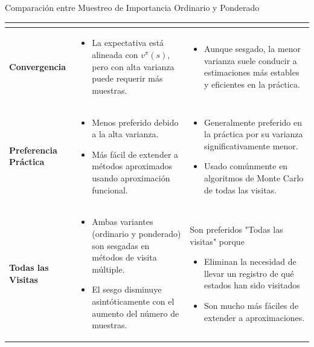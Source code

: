 \documentclass[10pt, envcountsect, handout, aspectratio=1610, hyperref={hypertexnames=true}]{beamer}
\begin{document}
\begin{frame}{Comparación entre Muestreo de Importancia Ordinario y Ponderado}
{\begin{minipage}{\textwidth}
\begin{tabular}{>{\raggedright\arraybackslash}m{3cm} >{\raggedright\arraybackslash}m{10cm} >{\raggedright\arraybackslash}m{10cm}}
\begin{itemize}
	\end{itemize}
	\\
	\midrule
	\textbf{Convergencia} & 
	\begin{itemize}
		\item La expectativa está alineada con $v^\pi(s)$, pero con alta varianza puede requerir más muestras.
	\end{itemize}
	&
	\begin{itemize}
		\item Aunque sesgado, la menor varianza suele conducir a estimaciones más estables y eficientes en la práctica.
	\end{itemize}
	\\
	\midrule
	\textbf{Preferencia Práctica} & 
	\begin{itemize}
		\item Menos preferido debido a la alta varianza.
		\item Más fácil de extender a métodos aproximados usando aproximación funcional.
	\end{itemize}
	&
	\begin{itemize}
		\item Generalmente preferido en la práctica por su varianza significativamente menor.
		\item Usado comúnmente en algoritmos de Monte Carlo de todas las visitas.
	\end{itemize}
	\\
	\midrule \midrule \midrule
	\textbf{Todas las Visitas} & 
	\begin{itemize}
		\item Ambas variantes (ordinario y ponderado) son sesgadas en métodos de visita múltiple.
		\item El sesgo disminuye asintóticamente con el aumento del número de muestras.
	\end{itemize}
	&
	Son preferidos "Todas las visitas" porque
	\begin{itemize}
		\item Eliminan la necesidad de llevar un registro de qué estados han sido visitados 
		\item Son mucho más fáciles de extender a aproximaciones.
	\end{itemize}
	\\
	\bottomrule
\end{tabular}
\end{minipage}}

\end{frame}
\end{document}
